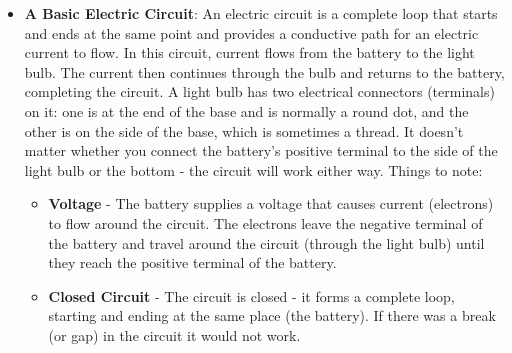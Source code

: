 \documentclass{report}
\begin{document}
\begin{itemize}
            \bigbreak \noindent 
            A \textbf{power rating} is the maximum amount of power a device or machine can safely consume, handle, or produce under normal operating conditions
            \bigbreak \noindent 
            In the same way that you can calculate the power generated by a circuit if you know the voltage and current, you can calculate the current flowing through a circuit if you know the power and voltage. To do this you just need to rearrange the above formula:
            \begin{align*}
                I &= \frac{W}{V}, \\
                V &= \frac{W}{I}
            .\end{align*}
            \textbf{Note:} One watt is equal to one joule of energy used or transferred per second
            \begin{align*}
                W = \frac{J}{s}
            .\end{align*}
        \item \textbf{A Basic Electric Circuit}: An electric circuit is a complete loop that starts and ends at the same point and provides a conductive path for an electric current to flow.
            \bigbreak \noindent 
            \bigbreak \noindent 
            In this circuit, current flows from the battery to the light bulb. The current then continues through the bulb and returns to the battery, completing the circuit.
            \bigbreak \noindent 
            A light bulb has two electrical connectors (terminals) on it: one is at the end of the base and is normally a round dot, and the other is on the side of the base, which is sometimes a thread. It doesn't matter whether you connect the battery's positive terminal to the side of the light bulb or the bottom - the circuit will work either way.
            \bigbreak \noindent 
            Things to note:
            \begin{itemize}
                \item \textbf{Voltage} - The battery supplies a voltage that causes current (electrons) to flow around the circuit. The electrons leave the negative terminal of the battery and travel around the circuit (through the light bulb) until they reach the positive terminal of the battery.
                \item \textbf{Closed Circuit} - The circuit is closed - it forms a complete loop, starting and ending at the same place (the battery). If there was a break (or gap) in the circuit it would not work.

\end{itemize}
\end{itemize}
\end{document}
